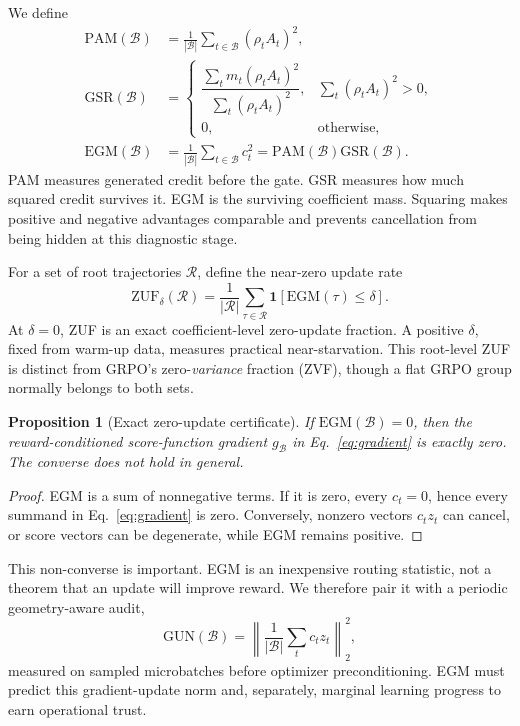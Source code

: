 \documentclass{article}
\newtheorem{proposition}{Proposition}
\newcommand{\egm}{\mathrm{EGM}}
\newcommand{\pam}{\mathrm{PAM}}
\newcommand{\gsr}{\mathrm{GSR}}
\newcommand{\zuf}{\mathrm{ZUF}}
\newcommand{\ind}{\mathbf{1}}
\begin{document}
We define
\begin{align}
  \pam(\mathcal{B})
    &=\frac{1}{|\mathcal{B}|}\sum_{t\in\mathcal{B}}(\rho_t A_t)^2,
    \label{eq:pam}\\
  \gsr(\mathcal{B})
    &=\begin{cases}
       \dfrac{\sum_t m_t(\rho_t A_t)^2}
             {\sum_t(\rho_t A_t)^2}, & \sum_t(\rho_t A_t)^2>0,\\[7pt]
       0, & \text{otherwise,}
      \end{cases}
    \label{eq:gsr}\\
  \egm(\mathcal{B})
    &=\frac{1}{|\mathcal{B}|}\sum_{t\in\mathcal{B}}c_t^2
      =\pam(\mathcal{B})\gsr(\mathcal{B}).
    \label{eq:egm}
\end{align}
PAM measures generated credit before the gate.  GSR measures how much squared
credit survives it.  EGM is the surviving coefficient mass.  Squaring makes
positive and negative advantages comparable and prevents cancellation from
being hidden at this diagnostic stage.

For a set of root trajectories $\mathcal{R}$, define the near-zero update rate
\begin{equation}
  \zuf_{\delta}(\mathcal{R})=
  \frac{1}{|\mathcal{R}|}\sum_{\tau\in\mathcal{R}}
  \ind\!\left[\egm(\tau)\leq\delta\right].
  \label{eq:zuf}
\end{equation}
At $\delta=0$, ZUF is an exact coefficient-level zero-update fraction.  A
positive $\delta$, fixed from warm-up data, measures practical near-starvation.
This root-level ZUF is distinct from GRPO's zero-\emph{variance} fraction
(ZVF), though a flat GRPO group normally belongs to both sets.

\begin{proposition}[Exact zero-update certificate]
If $\egm(\mathcal{B})=0$, then the reward-conditioned score-function gradient
$g_{\mathcal{B}}$ in Eq.~\eqref{eq:gradient} is exactly zero.
The converse does not hold in general.
\end{proposition}
\begin{proof}
EGM is a sum of nonnegative terms.  If it is zero, every $c_t=0$, hence every
summand in Eq.~\eqref{eq:gradient} is zero.  Conversely, nonzero vectors
$c_tz_t$ can cancel, or score vectors can be degenerate, while EGM remains
positive.
\end{proof}

This non-converse is important.  EGM is an inexpensive routing statistic, not
a theorem that an update will improve reward.  We therefore pair it with a
periodic geometry-aware audit,
\begin{equation}
  \mathrm{GUN}(\mathcal{B})=\left\|
  \frac{1}{|\mathcal{B}|}\sum_t c_tz_t\right\|_2^2,
  \label{eq:gun}
\end{equation}
measured on sampled microbatches before optimizer preconditioning.  EGM must
predict this gradient-update norm and, separately, marginal learning progress
to earn operational trust.
\end{document}
